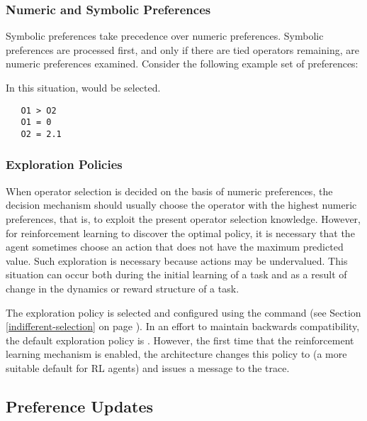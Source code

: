 \subsubsection{Numeric and Symbolic Preferences}

Symbolic preferences take precedence over numeric preferences.  Symbolic preferences are processed first, and only if there are tied operators remaining, are numeric preferences examined.  Consider the following example set of preferences:

In this situation,  would be selected.

\begin{verbatim}
   O1 > O2
   O1 = 0
   O2 = 2.1
\end{verbatim}  

\subsubsection{Exploration Policies}

When operator selection is decided on the basis of numeric preferences, the decision mechanism should usually choose the operator with the highest numeric preferences, that is, to exploit the present operator selection knowledge.  However, for reinforcement learning to discover the optimal policy, it is necessary that the agent sometimes choose an action that does not have the maximum predicted value.  Such exploration is necessary because actions may be undervalued.  This situation can occur both during the initial learning of a task and as a result of change in the dynamics or reward structure of a task.

The exploration policy is selected and configured using the  command (see Section \ref{indifferent-selection} on page \pageref{indifferent-selection}). In an effort to maintain backwards compatibility, the default exploration policy is .  However, the first time that the reinforcement learning mechanism is enabled, the architecture changes this policy to  (a more suitable default for RL agents) and issues a message to the trace.

\subsection{Preference Updates}
\label{RL-pref-updates}

